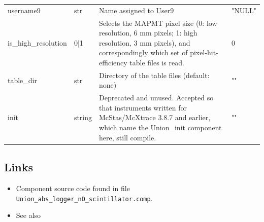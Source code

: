 \begin{longtable}{p{}p{}p{}p{}}
username9 & str & Name assigned to User9 & "NULL" \\
is\_high\_resolution & 0|1 & Selects the MAPMT pixel size (0: low resolution, 6 mm pixels; 1: high resolution, 3 mm pixels), and correspondingly which set of pixel-hit-efficiency table files is read. & 0 \\
table\_dir & str & Directory of the table files (default: none) & "" \\
init & string & Deprecated and unused. Accepted so that instruments written for McStas/McXtrace 3.8.7 and earlier, which name the Union\_init component here, still compile. & "" \\
\bottomrule
\end{longtable}

\subsection*{Links}
\begin{itemize}
  \item Component source code found in file \texttt{Union\_abs\_logger\_nD\_scintillator.comp}.
  \item See also 
\end{itemize}
